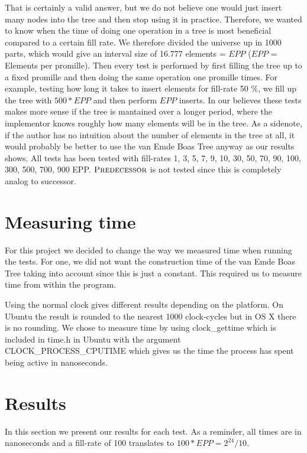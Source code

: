 \documentclass[oneside,11pt,openright]{report}
\newcommand{\Predecessor}{\textsc{Predecessor}}
\begin{document}
That is certainly a valid answer, but we do not believe one would just insert many nodes into the tree and then stop using it in practice. Therefore, we wanted to know when the time of doing one operation in a tree is most beneficial compared to a certain fill rate. We therefore divided the universe up in 1000 parts, which would give an interval size of 16.777 elements = $EPP$ ($EPP$ = Elements per promille). Then every test is performed by first filling the tree up to a fixed promille and then doing the same operation one promille times. For example, testing how long it takes to insert elements for fill-rate 50 \%, we fill up the tree with $500 * EPP$ and then perform $EPP$ inserts. In our believes these tests makes more sense if the tree is mantained over a longer period, where the implementor knows roughly how many elements will be in the tree. As a sidenote, if the author has no intuition about the number of elements in the tree at all, it would probably be better to use the van Emde Boas Tree anyway as our results shows. All tests has been tested with fill-rates 1, 3, 5, 7, 9, 10, 30, 50, 70, 90, 100, 300, 500, 700, 900 EPP. $\Predecessor$ is not tested since this is completely analog to successor.

\section{Measuring time}

For this project we decided to change the way we measured time when running the tests. For one, we did not want the construction time of the van Emde Boas Tree taking into account since this is just a constant. This required us to measure time from within the program.

Using the normal clock gives different results depending on the platform. On Ubuntu the result is rounded to the nearest 1000 clock-cycles but in OS X there is no rounding. We chose to measure time by using clock\_gettime which is included in time.h in Ubuntu with the argument CLOCK\_PROCESS\_CPUTIME which gives us the time the process has spent being active in nanoseconds.

\section{Results}

In this section we present our results for each test. As a reminder, all times are in nanoseconds and a fill-rate of 100 translates to $100 * EPP = 2^24/10$.
\end{document}
